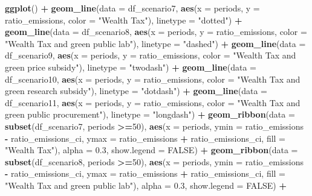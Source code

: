\documentclass[
]{article}
\newenvironment{Shaded}{\begin{snugshade}}{\end{snugshade}}
\newcommand{\AttributeTok}[1]{\textcolor[rgb]{0.13,0.29,0.53}{#1}}
\newcommand{\ConstantTok}[1]{\textcolor[rgb]{0.56,0.35,0.01}{#1}}
\newcommand{\DecValTok}[1]{\textcolor[rgb]{0.00,0.00,0.81}{#1}}
\newcommand{\FloatTok}[1]{\textcolor[rgb]{0.00,0.00,0.81}{#1}}
\newcommand{\FunctionTok}[1]{\textcolor[rgb]{0.13,0.29,0.53}{\textbf{#1}}}
\newcommand{\NormalTok}[1]{#1}
\newcommand{\SpecialCharTok}[1]{\textcolor[rgb]{0.81,0.36,0.00}{\textbf{#1}}}
\newcommand{\StringTok}[1]{\textcolor[rgb]{0.31,0.60,0.02}{#1}}
\begin{document}
\begin{Shaded}
\begin{Highlighting}[]
\FunctionTok{ggplot}\NormalTok{() }\SpecialCharTok{+}
  \FunctionTok{geom\_line}\NormalTok{(}\AttributeTok{data =}\NormalTok{ df\_scenario7, }\FunctionTok{aes}\NormalTok{(}\AttributeTok{x =}\NormalTok{ periods, }\AttributeTok{y =}\NormalTok{ ratio\_emissions, }\AttributeTok{color =} \StringTok{"Wealth Tax"}\NormalTok{), }\AttributeTok{linetype =} \StringTok{"dotted"}\NormalTok{) }\SpecialCharTok{+}
  \FunctionTok{geom\_line}\NormalTok{(}\AttributeTok{data =}\NormalTok{ df\_scenario8, }\FunctionTok{aes}\NormalTok{(}\AttributeTok{x =}\NormalTok{ periods, }\AttributeTok{y =}\NormalTok{ ratio\_emissions, }\AttributeTok{color =} \StringTok{"Wealth Tax and green public lab"}\NormalTok{), }\AttributeTok{linetype =} \StringTok{"dashed"}\NormalTok{) }\SpecialCharTok{+}
  \FunctionTok{geom\_line}\NormalTok{(}\AttributeTok{data =}\NormalTok{ df\_scenario9, }\FunctionTok{aes}\NormalTok{(}\AttributeTok{x =}\NormalTok{ periods, }\AttributeTok{y =}\NormalTok{ ratio\_emissions, }\AttributeTok{color =} \StringTok{"Wealth Tax and green price subsidy"}\NormalTok{), }\AttributeTok{linetype =} \StringTok{"twodash"}\NormalTok{) }\SpecialCharTok{+}
  \FunctionTok{geom\_line}\NormalTok{(}\AttributeTok{data =}\NormalTok{ df\_scenario10, }\FunctionTok{aes}\NormalTok{(}\AttributeTok{x =}\NormalTok{ periods, }\AttributeTok{y =}\NormalTok{ ratio\_emissions, }\AttributeTok{color =} \StringTok{"Wealth Tax and green research subsidy"}\NormalTok{), }\AttributeTok{linetype =} \StringTok{"dotdash"}\NormalTok{) }\SpecialCharTok{+}
  \FunctionTok{geom\_line}\NormalTok{(}\AttributeTok{data =}\NormalTok{ df\_scenario11, }\FunctionTok{aes}\NormalTok{(}\AttributeTok{x =}\NormalTok{ periods, }\AttributeTok{y =}\NormalTok{ ratio\_emissions, }\AttributeTok{color =} \StringTok{"Wealth Tax and green public procurement"}\NormalTok{), }\AttributeTok{linetype =} \StringTok{"longdash"}\NormalTok{) }\SpecialCharTok{+}
  \FunctionTok{geom\_ribbon}\NormalTok{(}\AttributeTok{data =} \FunctionTok{subset}\NormalTok{(df\_scenario7, periods }\SpecialCharTok{\textgreater{}=}\DecValTok{50}\NormalTok{), }\FunctionTok{aes}\NormalTok{(}\AttributeTok{x =}\NormalTok{ periods, }\AttributeTok{ymin =}\NormalTok{ ratio\_emissions }\SpecialCharTok{{-}}\NormalTok{ ratio\_emissions\_ci, }\AttributeTok{ymax =}\NormalTok{ ratio\_emissions }\SpecialCharTok{+}\NormalTok{ ratio\_emissions\_ci, }\AttributeTok{fill =} \StringTok{"Wealth Tax"}\NormalTok{), }\AttributeTok{alpha =} \FloatTok{0.3}\NormalTok{, }\AttributeTok{show.legend =} \ConstantTok{FALSE}\NormalTok{) }\SpecialCharTok{+}
  \FunctionTok{geom\_ribbon}\NormalTok{(}\AttributeTok{data =} \FunctionTok{subset}\NormalTok{(df\_scenario8, periods }\SpecialCharTok{\textgreater{}=}\DecValTok{50}\NormalTok{), }\FunctionTok{aes}\NormalTok{(}\AttributeTok{x =}\NormalTok{ periods, }\AttributeTok{ymin =}\NormalTok{ ratio\_emissions }\SpecialCharTok{{-}}\NormalTok{ ratio\_emissions\_ci, }\AttributeTok{ymax =}\NormalTok{ ratio\_emissions }\SpecialCharTok{+}\NormalTok{ ratio\_emissions\_ci, }\AttributeTok{fill =} \StringTok{"Wealth Tax and green public lab"}\NormalTok{), }\AttributeTok{alpha =} \FloatTok{0.3}\NormalTok{, }\AttributeTok{show.legend =} \ConstantTok{FALSE}\NormalTok{) }\SpecialCharTok{+}

\end{Highlighting}
\end{Shaded}
\end{document}
